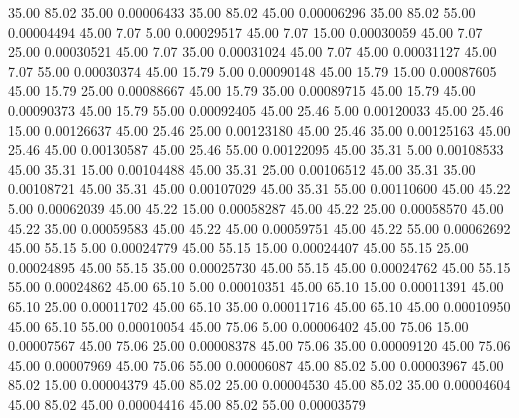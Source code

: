      35.00     85.02     35.00     0.00006433
     35.00     85.02     45.00     0.00006296
     35.00     85.02     55.00     0.00004494
     45.00      7.07      5.00     0.00029517
     45.00      7.07     15.00     0.00030059
     45.00      7.07     25.00     0.00030521
     45.00      7.07     35.00     0.00031024
     45.00      7.07     45.00     0.00031127
     45.00      7.07     55.00     0.00030374
     45.00     15.79      5.00     0.00090148
     45.00     15.79     15.00     0.00087605
     45.00     15.79     25.00     0.00088667
     45.00     15.79     35.00     0.00089715
     45.00     15.79     45.00     0.00090373
     45.00     15.79     55.00     0.00092405
     45.00     25.46      5.00     0.00120033
     45.00     25.46     15.00     0.00126637
     45.00     25.46     25.00     0.00123180
     45.00     25.46     35.00     0.00125163
     45.00     25.46     45.00     0.00130587
     45.00     25.46     55.00     0.00122095
     45.00     35.31      5.00     0.00108533
     45.00     35.31     15.00     0.00104488
     45.00     35.31     25.00     0.00106512
     45.00     35.31     35.00     0.00108721
     45.00     35.31     45.00     0.00107029
     45.00     35.31     55.00     0.00110600
     45.00     45.22      5.00     0.00062039
     45.00     45.22     15.00     0.00058287
     45.00     45.22     25.00     0.00058570
     45.00     45.22     35.00     0.00059583
     45.00     45.22     45.00     0.00059751
     45.00     45.22     55.00     0.00062692
     45.00     55.15      5.00     0.00024779
     45.00     55.15     15.00     0.00024407
     45.00     55.15     25.00     0.00024895
     45.00     55.15     35.00     0.00025730
     45.00     55.15     45.00     0.00024762
     45.00     55.15     55.00     0.00024862
     45.00     65.10      5.00     0.00010351
     45.00     65.10     15.00     0.00011391
     45.00     65.10     25.00     0.00011702
     45.00     65.10     35.00     0.00011716
     45.00     65.10     45.00     0.00010950
     45.00     65.10     55.00     0.00010054
     45.00     75.06      5.00     0.00006402
     45.00     75.06     15.00     0.00007567
     45.00     75.06     25.00     0.00008378
     45.00     75.06     35.00     0.00009120
     45.00     75.06     45.00     0.00007969
     45.00     75.06     55.00     0.00006087
     45.00     85.02      5.00     0.00003967
     45.00     85.02     15.00     0.00004379
     45.00     85.02     25.00     0.00004530
     45.00     85.02     35.00     0.00004604
     45.00     85.02     45.00     0.00004416
     45.00     85.02     55.00     0.00003579
